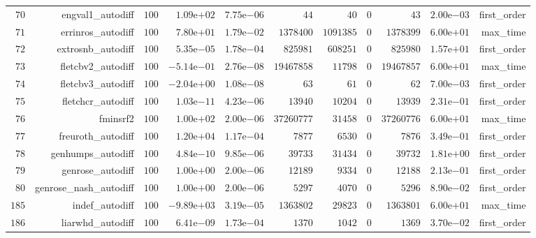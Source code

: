 \documentclass[varwidth=20cm,crop=true]{standalone}
\begin{document}
\begin{longtable}{rrrrrrrrrrr}
  \(    70\) & engval1\_autodiff & \(   100\) & \( 1.09\)e\(+02\) & \( 7.75\)e\(-06\) & \(    44\) & \(    40\) & \(     0\) & \(    43\) & \( 2.00\)e\(-03\) & first\_order \\
  \(    71\) & errinros\_autodiff & \(   100\) & \( 7.80\)e\(+01\) & \( 1.79\)e\(-02\) & \(1378400\) & \(1091385\) & \(     0\) & \(1378399\) & \( 6.00\)e\(+01\) & max\_time \\
  \(    72\) & extrosnb\_autodiff & \(   100\) & \( 5.35\)e\(-05\) & \( 1.78\)e\(-04\) & \(825981\) & \(608251\) & \(     0\) & \(825980\) & \( 1.57\)e\(+01\) & first\_order \\
  \(    73\) & fletcbv2\_autodiff & \(   100\) & \(-5.14\)e\(-01\) & \( 2.76\)e\(-08\) & \(19467858\) & \( 11798\) & \(     0\) & \(19467857\) & \( 6.00\)e\(+01\) & max\_time \\
  \(    74\) & fletcbv3\_autodiff & \(   100\) & \(-2.04\)e\(+00\) & \( 1.08\)e\(-08\) & \(    63\) & \(    61\) & \(     0\) & \(    62\) & \( 7.00\)e\(-03\) & first\_order \\
  \(    75\) & fletchcr\_autodiff & \(   100\) & \( 1.03\)e\(-11\) & \( 4.23\)e\(-06\) & \( 13940\) & \( 10204\) & \(     0\) & \( 13939\) & \( 2.31\)e\(-01\) & first\_order \\
  \(    76\) & fminsrf2 & \(   100\) & \( 1.00\)e\(+02\) & \( 2.00\)e\(-06\) & \(37260777\) & \( 31458\) & \(     0\) & \(37260776\) & \( 6.00\)e\(+01\) & max\_time \\
  \(    77\) & freuroth\_autodiff & \(   100\) & \( 1.20\)e\(+04\) & \( 1.17\)e\(-04\) & \(  7877\) & \(  6530\) & \(     0\) & \(  7876\) & \( 3.49\)e\(-01\) & first\_order \\
  \(    78\) & genhumps\_autodiff & \(   100\) & \( 4.84\)e\(-10\) & \( 9.85\)e\(-06\) & \( 39733\) & \( 31434\) & \(     0\) & \( 39732\) & \( 1.81\)e\(+00\) & first\_order \\
  \(    79\) & genrose\_autodiff & \(   100\) & \( 1.00\)e\(+00\) & \( 2.00\)e\(-06\) & \( 12189\) & \(  9334\) & \(     0\) & \( 12188\) & \( 2.13\)e\(-01\) & first\_order \\
  \(    80\) & genrose\_nash\_autodiff & \(   100\) & \( 1.00\)e\(+00\) & \( 2.00\)e\(-06\) & \(  5297\) & \(  4070\) & \(     0\) & \(  5296\) & \( 8.90\)e\(-02\) & first\_order \\
  \(   185\) & indef\_autodiff & \(   100\) & \(-9.89\)e\(+03\) & \( 3.19\)e\(-05\) & \(1363802\) & \( 29823\) & \(     0\) & \(1363801\) & \( 6.00\)e\(+01\) & max\_time \\
  \(   186\) & liarwhd\_autodiff & \(   100\) & \( 6.41\)e\(-09\) & \( 1.73\)e\(-04\) & \(  1370\) & \(  1042\) & \(     0\) & \(  1369\) & \( 3.70\)e\(-02\) & first\_order \\

\end{longtable}
\end{document}

